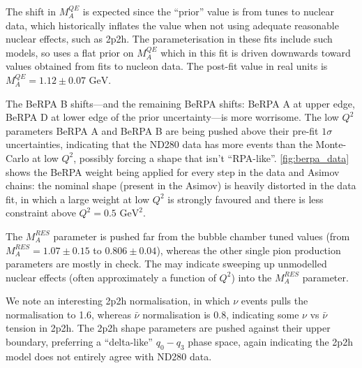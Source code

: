 The shift in $M_A^{QE}$ is expected since the ``prior'' value is from tunes to nuclear data, which historically inflates the value when not using adequate reasonable nuclear effects, such as 2p2h. The parameterisation in these fits include such models, so uses a flat prior on $M_A^{QE}$ which in this fit is driven downwards toward values obtained from fits to nucleon data. The post-fit value in real units is $M_A^{QE}=1.12\pm0.07\text{ GeV}$.

The BeRPA B shifts---and the remaining BeRPA shifts: BeRPA A at upper edge, BeRPA D at lower edge of the prior uncertainty---is more worrisome. The low $Q^2$ parameters BeRPA A and BeRPA B are being pushed above their pre-fit $1\sigma$ uncertainties, indicating that the ND280 data has more events than the Monte-Carlo at low $Q^2$, possibly forcing a shape that isn't ``RPA-like''. \autoref{fig:berpa_data} shows the BeRPA weight being applied for every step in the data and Asimov chains: the nominal shape (present in the Asimov) is heavily distorted in the data fit, in which a large weight at low $Q^2$ is strongly favoured and there is less constraint above $Q^2=0.5\text{ GeV}^2$.

The $M_A^{RES}$ parameter is pushed far from the bubble chamber tuned values (from $M_A^{RES}=1.07\pm0.15$ to $0.806\pm0.04$), whereas the other single pion production parameters are mostly in check. The may indicate sweeping up unmodelled nuclear effects (often approximately a function of $Q^2$) into the $M_A^{RES}$ parameter.

We note an interesting 2p2h normalisation, in which $\nu$ events pulls the normalisation to 1.6, whereas $\bar{\nu}$ normalisation is 0.8, indicating some $\nu$ vs $\bar{\nu}$ tension in 2p2h. The 2p2h shape parameters are pushed against their upper boundary, preferring a ``delta-like'' $q_0-q_3$ phase space, again indicating the 2p2h model does not entirely agree with ND280 data.

